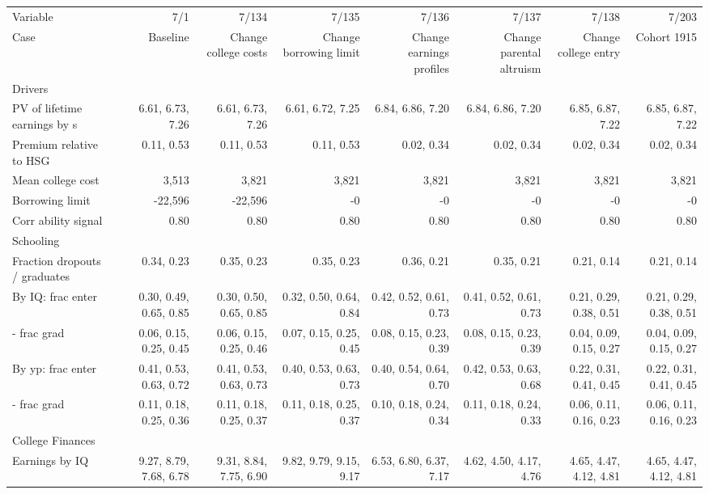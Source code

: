 \begin{tabular}{lrrrrrrr}
\hline
Variable & 7/1  & 7/134  & 7/135  & 7/136  & 7/137  & 7/138  & 7/203  \\ 
Case & Baseline  & Change college costs  & Change borrowing limit  & Change earnings profiles  & Change parental altruism  & Change college entry  & Cohort 1915  \\ 
Drivers &   &   &   &   &   &   &   \\ 
PV of lifetime earnings by s & 6.61, 6.73, 7.26  & 6.61, 6.73, 7.26  & 6.61, 6.72, 7.25  & 6.84, 6.86, 7.20  & 6.84, 6.86, 7.20  & 6.85, 6.87, 7.22  & 6.85, 6.87, 7.22  \\ 
Premium relative to HSG & 0.11, 0.53  & 0.11, 0.53  & 0.11, 0.53  & 0.02, 0.34  & 0.02, 0.34  & 0.02, 0.34  & 0.02, 0.34  \\ 
Mean college cost & 3,513  & 3,821  & 3,821  & 3,821  & 3,821  & 3,821  & 3,821  \\ 
Borrowing limit & -22,596  & -22,596  & -0  & -0  & -0  & -0  & -0  \\ 
Corr ability signal & 0.80  & 0.80  & 0.80  & 0.80  & 0.80  & 0.80  & 0.80  \\ 
\hline
Schooling &   &   &   &   &   &   &   \\ 
Fraction dropouts / graduates & 0.34, 0.23  & 0.35, 0.23  & 0.35, 0.23  & 0.36, 0.21  & 0.35, 0.21  & 0.21, 0.14  & 0.21, 0.14  \\ 
By IQ: frac enter & 0.30, 0.49, 0.65, 0.85  & 0.30, 0.50, 0.65, 0.85  & 0.32, 0.50, 0.64, 0.84  & 0.42, 0.52, 0.61, 0.73  & 0.41, 0.52, 0.61, 0.73  & 0.21, 0.29, 0.38, 0.51  & 0.21, 0.29, 0.38, 0.51  \\ 
- frac grad & 0.06, 0.15, 0.25, 0.45  & 0.06, 0.15, 0.25, 0.46  & 0.07, 0.15, 0.25, 0.45  & 0.08, 0.15, 0.23, 0.39  & 0.08, 0.15, 0.23, 0.39  & 0.04, 0.09, 0.15, 0.27  & 0.04, 0.09, 0.15, 0.27  \\ 
By yp: frac enter & 0.41, 0.53, 0.63, 0.72  & 0.41, 0.53, 0.63, 0.73  & 0.40, 0.53, 0.63, 0.73  & 0.40, 0.54, 0.64, 0.70  & 0.42, 0.53, 0.63, 0.68  & 0.22, 0.31, 0.41, 0.45  & 0.22, 0.31, 0.41, 0.45  \\ 
- frac grad & 0.11, 0.18, 0.25, 0.36  & 0.11, 0.18, 0.25, 0.37  & 0.11, 0.18, 0.25, 0.37  & 0.10, 0.18, 0.24, 0.34  & 0.11, 0.18, 0.24, 0.33  & 0.06, 0.11, 0.16, 0.23  & 0.06, 0.11, 0.16, 0.23  \\ 
\hline
College Finances &   &   &   &   &   &   &   \\ 
Earnings by IQ & 9.27, 8.79, 7.68, 6.78  & 9.31, 8.84, 7.75, 6.90  & 9.82, 9.79, 9.15, 9.17  & 6.53, 6.80, 6.37, 7.17  & 4.62, 4.50, 4.17, 4.76  & 4.65, 4.47, 4.12, 4.81  & 4.65, 4.47, 4.12, 4.81  \\ 

\end{tabular}
